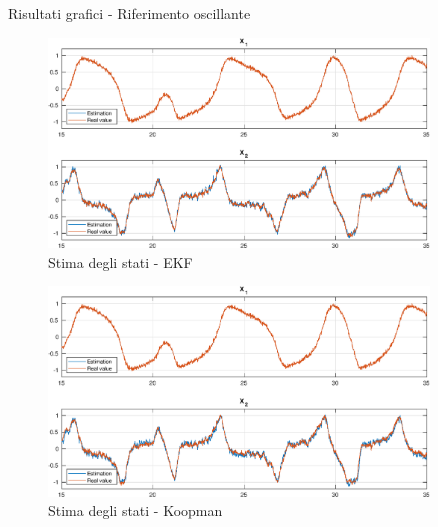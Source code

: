 \documentclass{beamer}
\begin{document}
\begin{frame}[allowframebreaks]{Risultati grafici - Riferimento oscillante}
    \begin{figure}
        \centering
        \includegraphics[width=0.9\textwidth]{Figures/osc_reference_kalman.eps}
        \caption{Stima degli stati - EKF}
    \end{figure}

    \begin{figure}
        \centering
        \includegraphics[width=0.9\textwidth]{Figures/osc_reference_koopman.eps}
        \caption{Stima degli stati - Koopman}
    \end{figure}
\end{frame}
\end{document}
